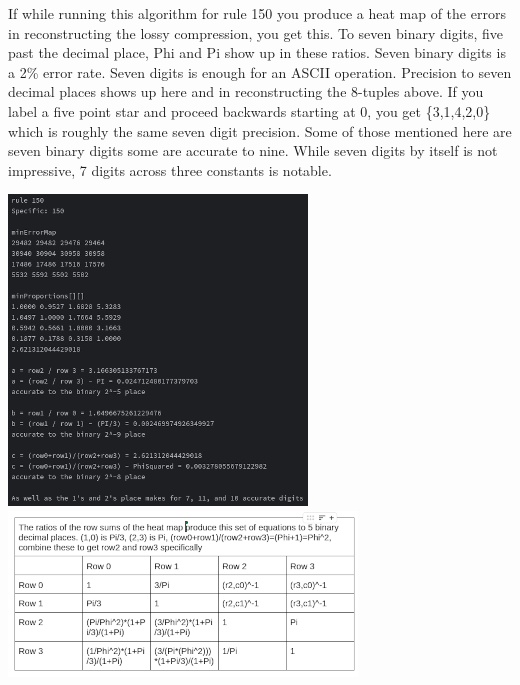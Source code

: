 \documentclass[11pt]{article}
\begin{document}
If while running this algorithm for rule 150 you produce a heat map of the errors in reconstructing the lossy compression, you get this. To seven binary digits, five past the decimal place, Phi and Pi show up in these ratios. Seven binary digits is a 2\% error rate. Seven digits is enough for an ASCII operation. Precision to seven decimal places shows up here and in reconstructing the 8-tuples above. If you label a five point star and proceed backwards starting at 0, you get \{3,1,4,2,0\} which is roughly the same seven digit precision. Some of those mentioned here are seven binary digits some are accurate to nine. While seven digits by itself is not impressive, 7 digits across three constants is notable.\\

\begin{center}
\includegraphics{PiRatios}\\
\includegraphics{RatioEquations}\\
\end{center}



\end{document}
